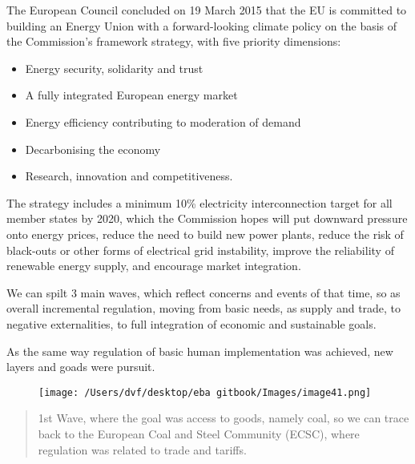 \documentclass[]{book}
\theoremstyle{definition}
\theoremstyle{definition}
\theoremstyle{definition}
\theoremstyle{remark}
\begin{document}
The European Council concluded on 19 March 2015 that the EU is committed
to building an Energy Union with a forward-looking climate policy on the
basis of the Commission's framework strategy, with five priority
dimensions:

\begin{itemize}
\item
  Energy security, solidarity and trust
\item
  A fully integrated European energy market
\item
  Energy efficiency contributing to moderation of demand
\item
  Decarbonising the economy
\item
  Research, innovation and competitiveness.
\end{itemize}

The strategy includes a minimum 10\% electricity interconnection target
for all member states by 2020, which the Commission hopes will put
downward pressure onto energy prices, reduce the need to build new power
plants, reduce the risk of black-outs or other forms of electrical grid
instability, improve the reliability of renewable energy supply, and
encourage market integration.

We can spilt 3 main waves, which reflect concerns and events of that
time, so as overall incremental regulation, moving from basic needs, as
supply and trade, to negative externalities, to full integration of
economic and sustainable goals.

As the same way regulation of basic human implementation was achieved,
new layers and goads were pursuit.

\begin{figure}[htbp]
\centering
\texttt{[image: /Users/dvf/desktop/eba gitbook/Images/image41.png]}
\caption{}
\end{figure}

\begin{quote}
1st Wave, where the goal was access to goods, namely coal, so we can
trace back to the European Coal and Steel Community (ECSC), where
regulation was related to trade and tariffs.
\end{quote}
\end{document}
